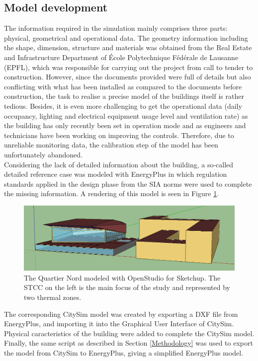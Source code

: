 \documentclass{tBPS2e}
\theoremstyle{plain}
\theoremstyle{definition}
\theoremstyle{remark}
\begin{document}
\subsection{Model development}
The information required in the simulation mainly comprises three parts: physical, geometrical and operational data. The geometry information including the shape, dimension, structure and materials was obtained from the Real Estate and Infrastructure Department of École Polytechnique Fédérale de Lausanne (EPFL), which was responsible for carrying out the project from call to tender to construction. However, since the documents provided were full of details but also conflicting with what has been installed as compared to the documents before construction, the task to realise a precise model of the buildings itself is rather tedious. Besides, it is even more challenging to get the operational data (daily occupancy, lighting and electrical equipment usage level and ventilation rate) as the building has only recently been set in operation mode and as engineers and technicians have been working on improving the controls. Therefore, due to unreliable monitoring data, the calibration step of the model has been unfortunately abandoned.\\

Considering the lack of detailed information about the building, a so-called detailed reference case was modeled with EnergyPlus \citep{Mauree:2015to} in which regulation standards applied in the design phase from the SIA norms were used to complete the missing information. A rendering of this model is seen in Figure \ref{fig:model_yang}.

\begin{figure}[H]
\centering
\includegraphics[width=\textwidth]{figures/model_yang}
\caption{The Quartier Nord modeled with OpenStudio for Sketchup. The STCC on the left is the main focus of the study and represented by two thermal zones.}
\label{fig:model_yang}
\end{figure}

The corresponding CitySim model was created by exporting a DXF file from EnergyPlus, and importing it into the Graphical User Interface of CitySim. Physical caracteristics of the building were added to complete the CitySim model. Finally, the same script as described in Section \ref{Methodology} was used to export the model from CitySim to EnergyPlus, giving a simplified EnergyPlus model.\\
\end{document}
